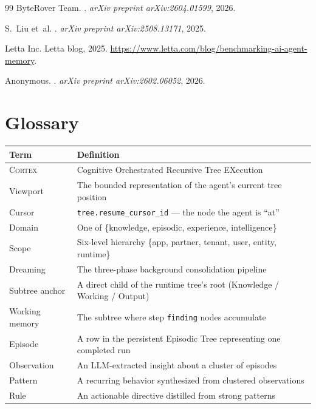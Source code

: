 \documentclass[11pt,a4paper]{article}
\theoremstyle{cortexprop}
\newcommand{\code}[1]{\texttt{#1}}
\begin{document}
\begin{thebibliography}{99}
ByteRover Team.
.
\newblock \textit{arXiv preprint arXiv:2604.01599}, 2026.

S.~Liu et~al.
.
\newblock \textit{arXiv preprint arXiv:2508.13171}, 2025.

Letta Inc.
\newblock Letta blog, 2025.
\newblock \url{https://www.letta.com/blog/benchmarking-ai-agent-memory}.

{Anonymous}.
.
\newblock \textit{arXiv preprint arXiv:2602.06052}, 2026.

\end{thebibliography}

\appendix

\section{Glossary}
\label{app:glossary}

\begin{table}[h]
\centering
\small
\begin{tabularx}{\linewidth}{lX}
\toprule
\textbf{Term} & \textbf{Definition}\\
\midrule
\textsc{Cortex} & Cognitive Orchestrated Recursive Tree EXecution \\
Viewport & The bounded representation of the agent's current tree position \\
Cursor & \code{tree.resume\_cursor\_id} --- the node the agent is ``at'' \\
Domain & One of \{knowledge, episodic, experience, intelligence\} \\
Scope & Six-level hierarchy \{app, partner, tenant, user, entity, runtime\} \\
Dreaming & The three-phase background consolidation pipeline \\
Subtree anchor & A direct child of the runtime tree's root (Knowledge / Working / Output) \\
Working memory & The subtree where step \code{finding} nodes accumulate \\
Episode & A row in the persistent Episodic Tree representing one completed run \\
Observation & An LLM-extracted insight about a cluster of episodes \\
Pattern & A recurring behavior synthesized from clustered observations \\
Rule & An actionable directive distilled from strong patterns \\
\bottomrule
\end{tabularx}
\end{table}
\end{document}
